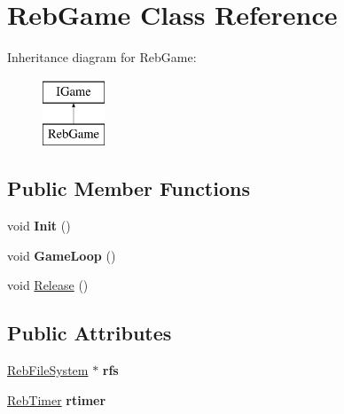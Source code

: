 \hypertarget{class_reb_game}{}\section{Reb\+Game Class Reference}
\label{class_reb_game}
Inheritance diagram for Reb\+Game\+:\begin{figure}[H]
\begin{center}
\leavevmode
\includegraphics[height=2.000000cm]{class_reb_game}
\end{center}
\end{figure}
\subsection*{Public Member Functions}
\begin{DoxyCompactItemize}
\item 
void {\bfseries Init} ()\hypertarget{class_reb_game_a1981bc8d7452e3064c0d4024a7651e0d}{}\label{class_reb_game_a1981bc8d7452e3064c0d4024a7651e0d}

\item 
void {\bfseries Game\+Loop} ()\hypertarget{class_reb_game_a38d3fb9bd1c949bf5ea9879c1f4f218f}{}\label{class_reb_game_a38d3fb9bd1c949bf5ea9879c1f4f218f}

\item 
void \hyperlink{class_reb_game_acf2c9d06a2a5206868f7f3c592768e70}{Release} ()
\end{DoxyCompactItemize}
\subsection*{Public Attributes}
\begin{DoxyCompactItemize}
\item 
\hyperlink{class_reb_file_system}{Reb\+File\+System} $\ast$ {\bfseries rfs}\hypertarget{class_reb_game_a83286fd9595aa8d8e55db8520b7f5798}{}\label{class_reb_game_a83286fd9595aa8d8e55db8520b7f5798}

\item 
\hyperlink{class_reb_timer}{Reb\+Timer} {\bfseries rtimer}\hypertarget{class_reb_game_abdecc4fa3befe4a367879eb1524b687d}{}\label{class_reb_game_abdecc4fa3befe4a367879eb1524b687d}

\end{DoxyCompactItemize}


